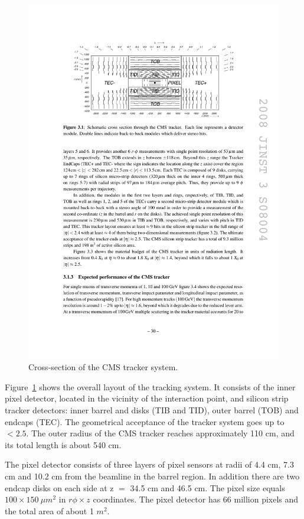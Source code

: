 \begin{figure}[htbp]
  \begin{center}
    \leavevmode
    \includegraphics[width=\columnwidth]{tracker}
    \caption{Cross-section of the CMS tracker system.}
    \label{Tracker}
  \end{center}
\end{figure}

Figure~\ref{Tracker} shows the overall layout of the tracking system. It consists of the inner pixel detector, located
in the vicinity of the interaction point, and silicon strip tracker detectors: inner barrel and disks (TIB and TID),
outer barrel (TOB) and endcaps (TEC). The geometrical acceptance of the tracker system goes up to \abs\eta $<2.5$. The
outer radius of the CMS tracker reaches approximately 110 cm, and its total length is about 540 cm.

The pixel detector consists of three layers of pixel sensors at radii of 4.4 cm, 7.3 cm and 10.2 cm from the beamline in
the barrel region. In addition there are two endcap disks on each side at \abs z $=$ 34.5 cm and 46.5 cm. The pixel size
equals $100 \times 150~\mu m^2$ in $r \phi \times z$ coordinates. The pixel detector has 66 million pixels and the total
area of about 1 $m^2$.

